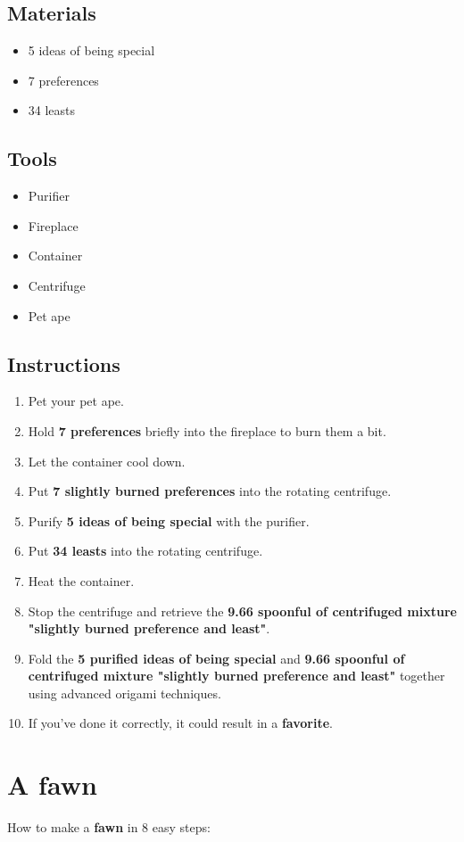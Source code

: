 \documentclass{article}
\begin{document}
\subsection{Materials}\begin{itemize}
\item 
5 ideas of being special
\item 
7 preferences
\item 
34 leasts
\end{itemize}
\subsection{Tools}\begin{itemize}
\item 
Purifier
\item 
Fireplace
\item 
Container
\item 
Centrifuge
\item 
Pet ape
\end{itemize}
\subsection{Instructions}\begin{enumerate}
\item 
Pet your pet ape.
\item 
Hold \textbf{7 preferences} briefly into the fireplace to burn them a bit.
\item 
Let the container cool down.
\item 
Put \textbf{7 slightly burned preferences} into the rotating centrifuge.
\item 
Purify \textbf{5 ideas of being special} with the purifier.
\item 
Put \textbf{34 leasts} into the rotating centrifuge.
\item 
Heat the container.
\item 
Stop the centrifuge and retrieve the \textbf{9.66 spoonful of centrifuged mixture "slightly burned preference and least"}.
\item 
Fold the \textbf{5 purified ideas of being special} and \textbf{9.66 spoonful of centrifuged mixture "slightly burned preference and least"} together using advanced origami techniques.
\item 
If you've done it correctly, it could result in a \textbf{favorite}.
\end{enumerate}
\newpage
\section{A fawn}How to make a \textbf{fawn} in 8 easy steps:
\end{document}
